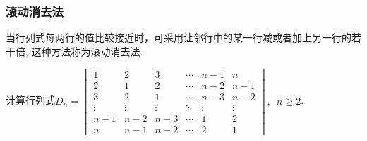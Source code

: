 \subsubsection{滚动消去法}

当行列式每两行的值比较接近时，可采用让邻行中的某一行减或者加上另一行的若干倍, 这种方法称为滚动消去法.

\begin{example}{}{}
    计算行列式$D_n=\begin{vmatrix}
            1      & 2      & 3      & \cdots & n-1    & n      \\
            2      & 1      & 2      & \cdots & n-2    & n-1    \\
            3      & 2      & 1      & \cdots & n-3    & n-2    \\
            \vdots & \vdots & \vdots & \ddots & \vdots & \vdots \\
            n-1    & n-2    & n-3    & \cdots & 1      & 2      \\
            n      & n-1    & n-2    & \cdots & 2      & 1
        \end{vmatrix},\enspace n \geqslant 2$.
\end{example}

